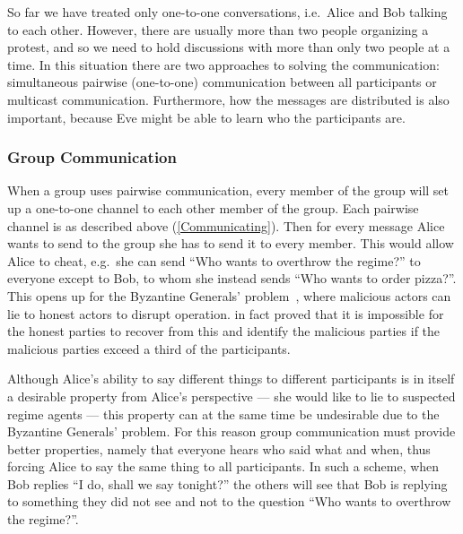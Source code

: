 So far we have treated only one-to-one conversations, i.e.\ Alice and Bob 
talking to each other.
However, there are usually more than two people organizing a protest, and so we 
need to hold discussions with more than only two people at a time.
In this situation there are two approaches to solving the communication:
simultaneous pairwise (one-to-one) communication between all participants or 
multicast communication.
Furthermore, how the messages are distributed is also important, because Eve 
might be able to learn who the participants are.

\subsubsection{Group Communication}
\label{GroupCommunication}

When a group uses pairwise communication, every member of the group will set up 
a one-to-one channel to each other member of the group.
Each pairwise channel is as described above (\cref{Communicating}).
Then for every message Alice wants to send to the group she has to send it to 
every member.
This would allow Alice to cheat, e.g.\ she can send \enquote{Who wants to 
  overthrow the regime?} to everyone except to Bob, to whom she instead sends 
\enquote{Who wants to order pizza?}.
This opens up for the Byzantine Generals' problem~\cite{ByzantineGenerals}, 
where malicious actors can lie to honest actors to disrupt operation.
\textcite{ByzantineGenerals} in fact proved that it is impossible for the 
honest parties to recover from this and identify the malicious parties if the 
malicious parties exceed a third of the participants.
  
Although Alice's ability to say different things to different participants is 
in itself a desirable property from Alice's perspective --- she would like to 
lie to suspected regime agents --- this property can at the same time be 
undesirable due to the Byzantine Generals' problem.
For this reason group communication must provide better properties, namely that 
everyone hears who said what and when, thus forcing Alice to say the same thing 
to all participants.
In such a scheme, when Bob replies \enquote{I do, shall we say tonight?} the 
others will see that Bob is replying to something they did not see and not to 
the question \enquote{Who wants to overthrow the regime?}.

